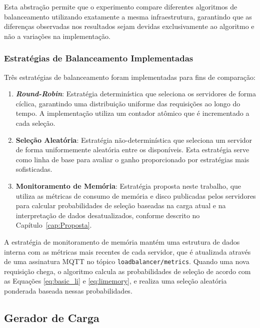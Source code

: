 Esta abstração permite que o experimento compare diferentes algoritmos de balanceamento utilizando exatamente a mesma infraestrutura, garantindo que as diferenças observadas nos resultados sejam devidas exclusivamente ao algoritmo e não a variações na implementação.

\subsubsection{Estratégias de Balanceamento Implementadas}

Três estratégias de balanceamento foram implementadas para fins de comparação:

\begin{enumerate}
    \item \textbf{\textit{Round-Robin}}: Estratégia determinística que seleciona os servidores de forma cíclica, garantindo uma distribuição uniforme das requisições ao longo do tempo. A implementação utiliza um contador atômico que é incrementado a cada seleção.
    
    \item \textbf{Seleção Aleatória}: Estratégia não-determinística que seleciona um servidor de forma uniformemente aleatória entre os disponíveis. Esta estratégia serve como linha de base para avaliar o ganho proporcionado por estratégias mais sofisticadas.
    
    \item \textbf{Monitoramento de Memória}: Estratégia proposta neste trabalho, que utiliza as métricas de consumo de memória e disco publicadas pelos servidores para calcular probabilidades de seleção baseadas na carga atual e na interpretação de dados desatualizados, conforme descrito no Capítulo~\ref{cap:Proposta}.
\end{enumerate}

A estratégia de monitoramento de memória mantém uma estrutura de dados interna com as métricas mais recentes de cada servidor, que é atualizada através de uma assinatura MQTT no tópico \texttt{loadbalancer/metrics}. Quando uma nova requisição chega, o algoritmo calcula as probabilidades de seleção de acordo com as Equações \ref{eq:basic_li} e \ref{eq:limemory}, e realiza uma seleção aleatória ponderada baseada nessas probabilidades.

\subsection{Gerador de Carga}

